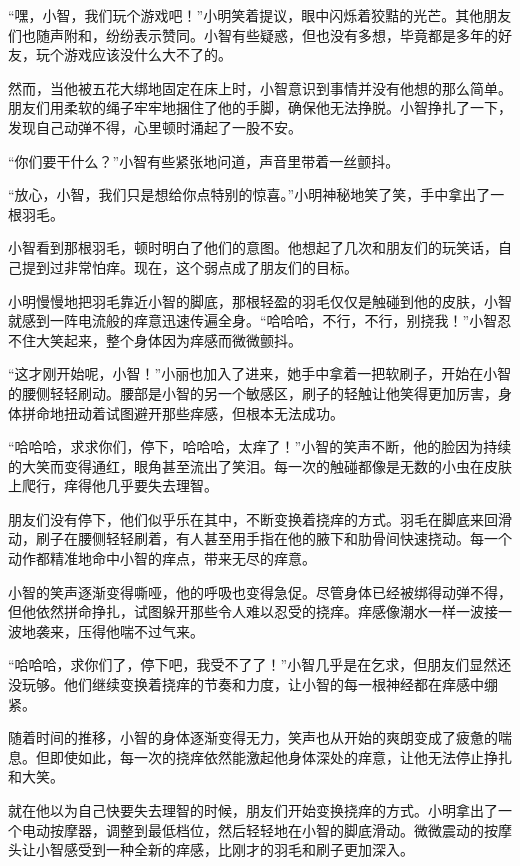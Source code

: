 \documentclass{exam-zh}
\begin{document}
\begin{material}[author = 杨宇, title = { 小智的故事 }]
“嘿，小智，我们玩个游戏吧！”小明笑着提议，眼中闪烁着狡黠的光芒。其他朋友们也随声附和，纷纷表示赞同。小智有些疑惑，但也没有多想，毕竟都是多年的好友，玩个游戏应该没什么大不了的。

然而，当他被五花大绑地固定在床上时，小智意识到事情并没有他想的那么简单。朋友们用柔软的绳子牢牢地捆住了他的手脚，确保他无法挣脱。小智挣扎了一下，发现自己动弹不得，心里顿时涌起了一股不安。

“你们要干什么？”小智有些紧张地问道，声音里带着一丝颤抖。

“放心，小智，我们只是想给你点特别的惊喜。”小明神秘地笑了笑，手中拿出了一根羽毛。

小智看到那根羽毛，顿时明白了他们的意图。他想起了几次和朋友们的玩笑话，自己提到过非常怕痒。现在，这个弱点成了朋友们的目标。

小明慢慢地把羽毛靠近小智的脚底，那根轻盈的羽毛仅仅是触碰到他的皮肤，小智就感到一阵电流般的痒意迅速传遍全身。“哈哈哈，不行，不行，别挠我！”小智忍不住大笑起来，整个身体因为痒感而微微颤抖。

“这才刚开始呢，小智！”小丽也加入了进来，她手中拿着一把软刷子，开始在小智的腰侧轻轻刷动。腰部是小智的另一个敏感区，刷子的轻触让他笑得更加厉害，身体拼命地扭动着试图避开那些痒感，但根本无法成功。

“哈哈哈，求求你们，停下，哈哈哈，太痒了！”小智的笑声不断，他的脸因为持续的大笑而变得通红，眼角甚至流出了笑泪。每一次的触碰都像是无数的小虫在皮肤上爬行，痒得他几乎要失去理智。

朋友们没有停下，他们似乎乐在其中，不断变换着挠痒的方式。羽毛在脚底来回滑动，刷子在腰侧轻轻刷着，有人甚至用手指在他的腋下和肋骨间快速挠动。每一个动作都精准地命中小智的痒点，带来无尽的痒意。

小智的笑声逐渐变得嘶哑，他的呼吸也变得急促。尽管身体已经被绑得动弹不得，但他依然拼命挣扎，试图躲开那些令人难以忍受的挠痒。痒感像潮水一样一波接一波地袭来，压得他喘不过气来。

“哈哈哈，求你们了，停下吧，我受不了了！”小智几乎是在乞求，但朋友们显然还没玩够。他们继续变换着挠痒的节奏和力度，让小智的每一根神经都在痒感中绷紧。

随着时间的推移，小智的身体逐渐变得无力，笑声也从开始的爽朗变成了疲惫的喘息。但即使如此，每一次的挠痒依然能激起他身体深处的痒意，让他无法停止挣扎和大笑。

就在他以为自己快要失去理智的时候，朋友们开始变换挠痒的方式。小明拿出了一个电动按摩器，调整到最低档位，然后轻轻地在小智的脚底滑动。微微震动的按摩头让小智感受到一种全新的痒感，比刚才的羽毛和刷子更加深入。


\end{material}
\end{document}
